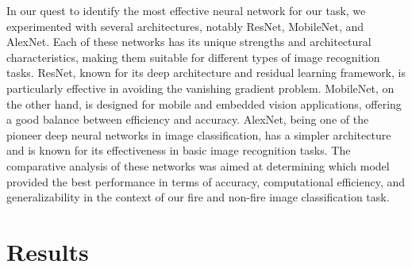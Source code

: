 In our quest to identify the most effective neural network for our task, we experimented with several architectures, notably ResNet, MobileNet, and AlexNet. Each of these networks has its unique strengths and architectural characteristics, making them suitable for different types of image recognition tasks. ResNet, known for its deep architecture and residual learning framework, is particularly effective in avoiding the vanishing gradient problem. MobileNet, on the other hand, is designed for mobile and embedded vision applications, offering a good balance between efficiency and accuracy. AlexNet, being one of the pioneer deep neural networks in image classification, has a simpler architecture and is known for its effectiveness in basic image recognition tasks. The comparative analysis of these networks was aimed at determining which model provided the best performance in terms of accuracy, computational efficiency, and generalizability in the context of our fire and non-fire image classification task.

\section{Results}

\begin{center}
\end{center}

